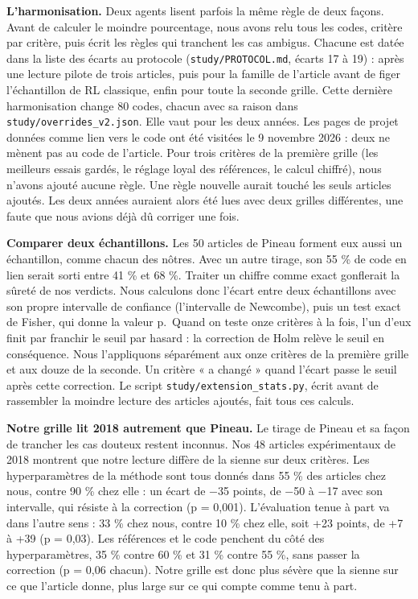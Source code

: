 \documentclass[11pt,a4paper]{article}
\begin{document}
\textbf{L'harmonisation.} Deux agents lisent parfois la même règle de
deux façons. Avant de calculer le moindre pourcentage, nous avons relu
tous les codes, critère par critère, puis écrit les règles qui tranchent
les cas ambigus. Chacune est datée dans la liste des écarts au protocole
(\texttt{study/PROTOCOL.md}, écarts 17 à 19) : après une lecture pilote
de trois articles, puis pour la famille de l'article avant de figer
l'échantillon de RL classique, enfin pour toute la seconde grille. Cette
dernière harmonisation change 80 codes, chacun avec sa raison dans
\texttt{study/overrides\_v2.json}. Elle vaut pour les deux années. Les
pages de projet données comme lien vers le code ont été visitées le 9
novembre 2026 : deux ne mènent pas au code de l'article. Pour trois
critères de la première grille (les meilleurs essais gardés, le réglage
loyal des références, le calcul chiffré), nous n'avons ajouté aucune
règle. Une règle nouvelle aurait touché les seuls articles ajoutés. Les
deux années auraient alors été lues avec deux grilles différentes, une
faute que nous avions déjà dû corriger une fois.

\textbf{Comparer deux échantillons.} Les 50 articles de Pineau forment
eux aussi un échantillon, comme chacun des nôtres. Avec un autre tirage,
son 55 \% de code en lien serait sorti entre 41 \% et 68 \%. Traiter un
chiffre comme exact gonflerait la sûreté de nos verdicts. Nous calculons
donc l'écart entre deux échantillons avec son propre intervalle de
confiance (l'intervalle de Newcombe), puis un test exact de Fisher, qui
donne la valeur p.~Quand on teste onze critères à la fois, l'un d'eux
finit par franchir le seuil par hasard : la correction de Holm relève le
seuil en conséquence. Nous l'appliquons séparément aux onze critères de
la première grille et aux douze de la seconde. Un critère « a changé »
quand l'écart passe le seuil après cette correction. Le script
\texttt{study/extension\_stats.py}, écrit avant de rassembler la moindre
lecture des articles ajoutés, fait tous ces calculs.

\textbf{Notre grille lit 2018 autrement que Pineau.} Le tirage de Pineau
et sa façon de trancher les cas douteux restent inconnus. Nos 48
articles expérimentaux de 2018 montrent que notre lecture diffère de la
sienne sur deux critères. Les hyperparamètres de la méthode sont tous
donnés dans 55 \% des articles chez nous, contre 90 \% chez elle : un
écart de −35 points, de −50 à −17 avec son intervalle, qui résiste à la
correction (p = 0,001). L'évaluation tenue à part va dans l'autre sens :
33 \% chez nous, contre 10 \% chez elle, soit +23 points, de +7 à +39 (p
= 0,03). Les références et le code penchent du côté des hyperparamètres,
35 \% contre 60 \% et 31 \% contre 55 \%, sans passer la correction (p =
0,06 chacun). Notre grille est donc plus sévère que la sienne sur ce que
l'article donne, plus large sur ce qui compte comme tenu à part.
\end{document}
